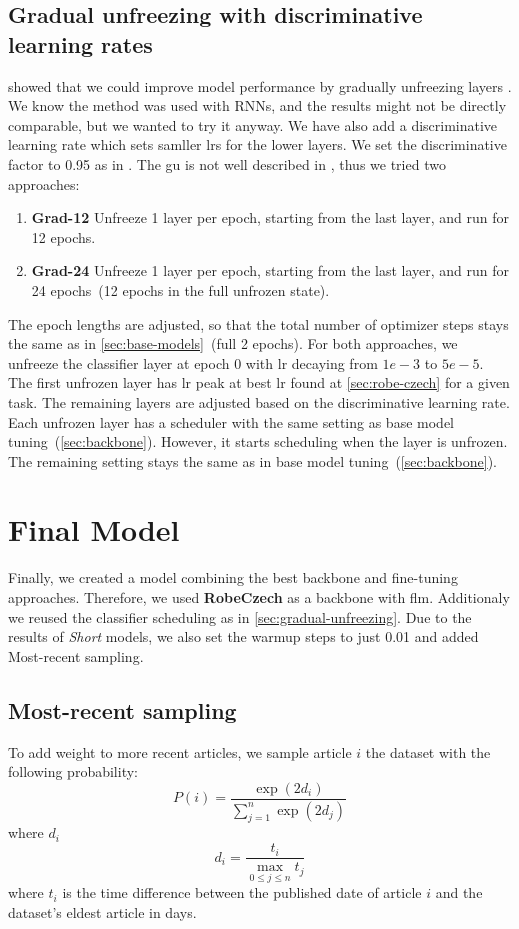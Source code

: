 \subsection{Gradual unfreezing with discriminative learning rates}
\label{sec:gradual-unfreezing}
\textcite{howardUniversalLanguageModel2018a} showed that we could improve model performance by gradually unfreezing layers
. We know the method was 
used with RNNs, and the results might not be directly comparable, but we wanted to try it anyway.
We have also add a discriminative learning rate which sets samller \acp{lr} for the lower layers.
We set the discriminative factor to 0.95 as in \parencite{sunHowFineTuneBERT2020}.
The \ac{gu} is not well described in \parencite{howardUniversalLanguageModel2018a}, thus we tried two approaches:
\begin{enumerate}
    \item \textbf{Grad-12} Unfreeze 1 layer per epoch, starting from the last layer, and run for 12 epochs.
    \item \textbf{Grad-24} Unfreeze 1 layer per epoch,
    starting from the last layer, and run for 24 epochs~(12 epochs in the full unfrozen state).
\end{enumerate}
The epoch lengths are adjusted, so that the total number of optimizer steps stays the same as in \autoref{sec:base-models}~(full 2 epochs).
For both approaches, we unfreeze the classifier layer at epoch 0 with \ac{lr} decaying from $1e-3$ to $ 5e-5$.
The first unfrozen layer has \ac{lr} peak at best \ac{lr} found at \autoref{sec:robe-czech} for a given task.
The remaining layers are adjusted based on the discriminative learning rate.
Each unfrozen layer has a scheduler with the same setting as base model tuning~(\autoref{sec:backbone}).
 However, it starts scheduling when the layer is unfrozen.
The remaining setting stays the same as in base model tuning~(\autoref{sec:backbone}).

\section{Final Model}
\label{sec:final-model}
Finally, we created a model combining the best backbone and fine-tuning approaches.
Therefore, we used \textbf{RobeCzech} as a backbone with \ac{flm}.
Additionaly we reused the classifier scheduling as in \autoref{sec:gradual-unfreezing}.
Due to the results of \textit{Short} models, we also set the warmup steps to just 0.01 and added
Most-recent sampling.
\subsection{Most-recent sampling}
To add weight to more recent articles, we sample article $i$ the dataset with the following probability:
\begin{equation}
    P(i) = \frac{\exp(2 d_i)}{\sum_{j=1}^{n} \exp(2 d_j)}
\end{equation}
where $d_i$
\begin{equation}
    d_i = \frac{t_i}{\max_{0\le j \le n}{t_j}}
\end{equation}
where $t_i$ is the time difference between the published date of article $i$ and the dataset's eldest article in days.
